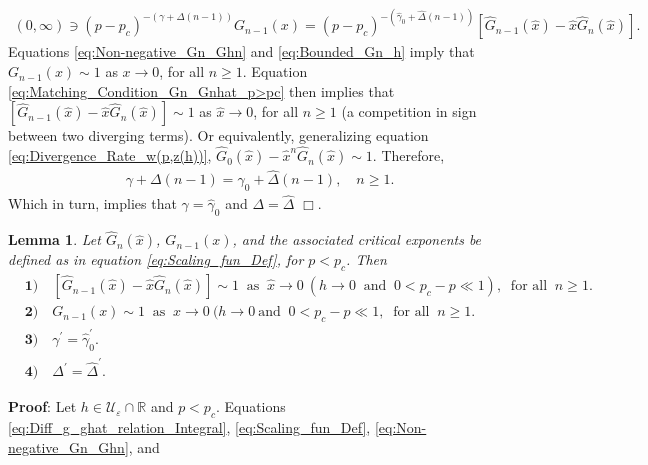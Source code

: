 \documentclass[english,12pt,jmp,graphicx]{revtex4-1}
\newtheorem{lemma}{Lemma}[section]
\newcommand{\ph}{\hat{\phi}}
\newcommand{\gh}{\hat{\gamma}}
\newcommand{\Dh}{\hat{\Delta}}
\newcommand{\xh}{\hat{x}}
\begin{document}
%
\begin{align}\label{eq:Matching_Condition_Gn_Gnhat_p>pc}
  (0,\infty)\ni(p-p_c)^{-(\gamma+\Delta(n-1))}G_{n-1}(x)
       =(p-p_c)^{-(\gh_0+\Dh(n-1))}[\hat{G}_{n-1}(\xh)-\xh\hat{G}_n(\xh)].
\end{align}
%
Equations \eqref{eq:Non-negative_Gn_Ghn} and \eqref{eq:Bounded_Gn_h}
imply that $G_{n-1}(x)\sim1$ as $x\to0$, for all $n\geq1$. Equation
\eqref{eq:Matching_Condition_Gn_Gnhat_p>pc} then implies that 
$[\hat{G}_{n-1}(\xh)-\xh\hat{G}_n(\xh)]\sim1$ as $\xh\to0$,
for all $n\geq1$ (a competition in sign between two diverging
terms). Or equivalently, generalizing
equation \eqref{eq:Divergence_Rate_w(p,z(h))},
$\hat{G}_0(\xh)-\xh^n\hat{G}_n(\xh)\sim1$. Therefore,   
%
\begin{align}
  \gamma+\Delta(n-1)=\gh_0+\Dh(n-1), \quad n\geq1.
\end{align}
%
Which in turn, implies that $\gamma=\gh_0$ and $\Delta=\Dh$ $\Box$.
%
%
 \begin{lemma}\label{lem:asymp_Scaling_funs_x_to_0_p<pc}
   Let $\hat{G}_n(\xh)$, $G_{n-1}(x)$, and the associated critical
   exponents be defined as in equation \eqref{eq:Scaling_fun_Def}, for
   $p<p_c$. Then
     \begin{align*}
    &\mathbf{1)}\quad [\hat{G}_{n-1}(\xh)-\xh\hat{G}_n(\xh)]\sim1 \ \text{ as } \ \xh\to0 \ (h\to0
    \ \text{ and } \ 0<p_c-p\ll1), \ \text{ for all } \ n\geq1. \\
    &\mathbf{2)}\quad G_{n-1}(x)\sim1 \ \text{ as } \ x\to0 \ (h\to0 \ \text{
      and } \ 0<p_c-p\ll1, \ \text{ for all } \ n\geq1.\\
    &\mathbf{3)}\quad \gamma^\prime=\gh_0^\prime.  \\%
    &\mathbf{4)}\quad \Delta^\prime=\Dh^\prime.   
     \end{align*}
 \end{lemma}
%
\noindent \textbf{Proof}:
%
Let $h\in\mathcal{U}_\varepsilon\cap\mathbb{R}$ and $p<p_c$.
Equations \eqref{eq:Diff_g_ghat_relation_Integral}, 
\eqref{eq:Scaling_fun_Def}, \eqref{eq:Non-negative_Gn_Ghn}, and
\end{document}
